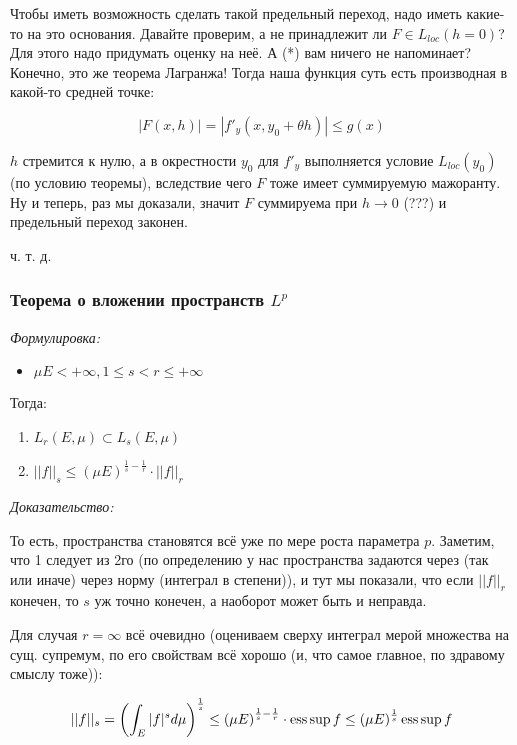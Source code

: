 \documentclass{article}
\begin{document}
Чтобы иметь возможность сделать такой предельный переход, надо иметь какие-то на это основания. Давайте проверим, а не принадлежит ли $F \in L_{loc}(h = 0)$? Для этого надо придумать оценку на неё. А (*) вам ничего не напоминает? Конечно, это же теорема Лагранжа! Тогда наша функция суть есть производная в какой-то средней точке:

\[|F(x, h)| = |f'_y(x, y_0 + \theta h)| \le g(x)\]

$h$ стремится к нулю, а в окрестности $y_0$ для $f'_y$ выполняется условие $L_{loc}(y_0)$ (по условию теоремы), вследствие чего $F$ тоже имеет суммируемую мажоранту. Ну и теперь, раз мы доказали, значит $F$ суммируема при $h \rightarrow 0$ (???) и предельный переход законен.

ч. т. д.

\subsubsection{Теорема о вложении пространств $L^p$}
\textit{Формулировка:}

\begin{itemize}
    \item $\mu E < + \infty, 1 \le s < r \le +\infty$
\end{itemize}

Тогда:

\begin{enumerate}
    \item $L_r(E, \mu) \subset L_s(E, \mu)$
    \item $||f||_s \le \left(\mu E\right)^{\frac{1}{s} - \frac{1}{r}} \cdot ||f||_{r}$
\end{enumerate}

\textit{Доказательство:}

То есть, пространства становятся всё уже по мере роста параметра $p$. Заметим, что 1 следует из 2го (по определению у нас пространства задаются через (так или иначе) через норму (интеграл в степени)), и тут мы показали, что если $||f||_r$ конечен, то $s$ уж точно конечен, а наоборот может быть и неправда.

Для случая $r = \infty$ всё очевидно (оцениваем сверху интеграл мерой множества на сущ. супремум, по его свойствам всё хорошо (и, что самое главное, по здравому смыслу тоже)):

\[||f||_s = \left(\int_{E} |f|^s d\mu\right)^{\frac{1}{s}} \le \left(\mu E\right)^{\frac{1}{s} - \frac{1}{r}} \cdot \operatorname*{ess\,sup} f \le (\mu E)^{\frac{1}{s}} \operatorname*{ess\,sup} f\]
\end{document}
